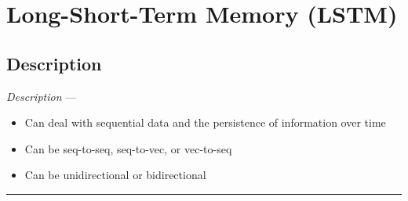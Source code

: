 \section{Long-Short-Term Memory (LSTM)}
\subsection*{Description}
\emph{Description} --- 
\begin{itemize}
    \item Can deal with sequential data and the persistence of information over time
    \item Can be seq-to-seq, seq-to-vec, or vec-to-seq
    \item Can be unidirectional or bidirectional
\end{itemize}

{\color{black}\hrule height 0.001mm}

